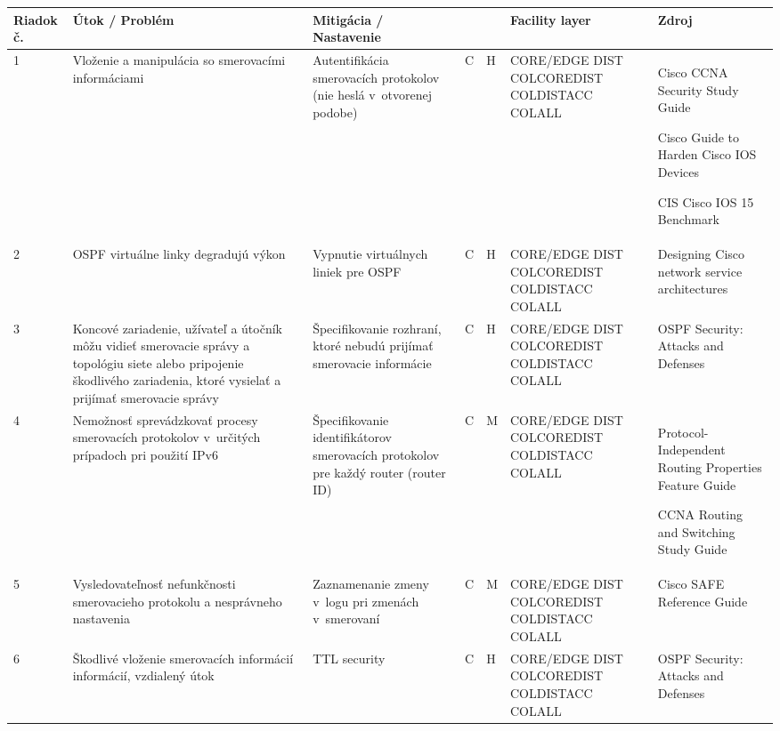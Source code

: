 \begin{longtable}[!htbp]{|C{2.5em}L{9em}L{9em}C{2em}C{2.5em}C{7.5em}L{10em}|}
	
	\hline
	\centering
	
	Riadok č.	&Útok / Problém	&Mitigácia / Nastavenie	& 	&	&Facility layer	&Zdroj\\
	\endhead
	
	 1	&Vloženie a manipulácia so smerovacími informáciami	&Autentifikácia smerovacích protokolov (nie heslá v~otvorenej podobe)	&C	&H	&CORE/EDGE
	DIST
	COLCOREDIST
	COLDISTACC
	COLALL	&Cisco CCNA Security Study Guide \cite{McMillan2018}
	
	Cisco Guide to Harden Cisco IOS Devices \cite{Singh2018}
	
	CIS Cisco IOS 15 Benchmark \cite{CIS_DrTLsgXv24lxeIIM}\\
	2	&OSPF virtuálne linky degradujú výkon	&Vypnutie virtuálnych liniek pre OSPF	&C	&H	&CORE/EDGE
	DIST
	COLCOREDIST
	COLDISTACC
	COLALL	&Designing Cisco network service architectures \cite{Tiso2012}\\
	 3	&Koncové zariadenie, užívateľ a útočník môžu vidieť smerovacie správy a topológiu siete alebo pripojenie škodlivého zariadenia, ktoré vysielať a prijímať smerovacie správy	&Špecifikovanie rozhraní, ktoré nebudú prijímať smerovacie informácie	&C	&H	&CORE/EDGE
	DIST
	COLCOREDIST
	COLDISTACC
	COLALL	&OSPF Security: Attacks and Defenses \cite{Khandelwal2016}\\
	4	&Nemožnosť sprevádzkovať procesy smerovacích protokolov v~určitých prípadoch pri použití IPv6	&Špecifikovanie identifikátorov smerovacích protokolov pre každý router (router ID)	&C	&M	&CORE/EDGE
	DIST
	COLCOREDIST
	COLDISTACC
	COLALL	&Protocol-Independent Routing Properties Feature Guide \cite{q7WZuvqA1fZEsYyL}
	
	CCNA Routing and Switching Study Guide \cite{Lammle2013}\\
	 5	&Vysledovateľnosť nefunkčnosti smerovacieho protokolu a nesprávneho nastavenia	&Zaznamenanie zmeny v~logu pri zmenách v~smerovaní	&C	&M	&CORE/EDGE
	DIST
	COLCOREDIST
	COLDISTACC
	COLALL	&Cisco SAFE Reference Guide \cite{uYLsMtQInofenpV3}
	\\
	6	& Škodlivé vloženie smerovacích informácií informácií, vzdialený útok	&TTL security	&C	&H	&CORE/EDGE
	DIST
	COLCOREDIST
	COLDISTACC
	COLALL	&OSPF Security: Attacks and Defenses \cite{Khandelwal2016}
	

\end{longtable}

